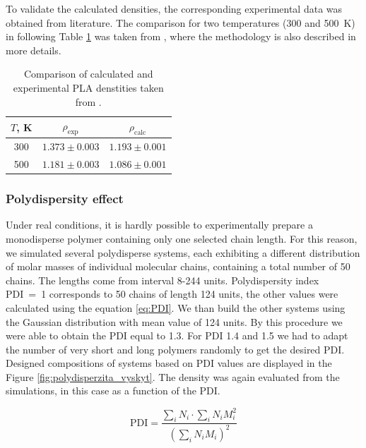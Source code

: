 To validate the calculated densities, the corresponding experimental data was obtained from literature. The comparison for two temperatures (300 and 500~K) in following Table \ref{tab:PLA_dens} was taken from \cite{klajmon_glass_2023}, where the methodology is also described in more details.

\begin{table}[htbp]
	\centering
	\caption{Comparison of calculated and experimental PLA denstities taken from \cite{klajmon_glass_2023}.}
	\begin{tabular}{ccc}
		\toprule
		$T$, K & $\rho_{\text{exp}}$ & $\rho_{\text{calc}}$ \\
		\midrule
		 300   & $1.373 \pm 0.003$ & $1.193 \pm 0.001$ \\
		 500   & $1.181 \pm 0.003$ & $1.086 \pm 0.001$ \\
		\bottomrule
	\end{tabular}%
	\label{tab:PLA_dens}%
\end{table}%

\subsubsection{Polydispersity effect}
Under real conditions, it is hardly possible to experimentally prepare a monodisperse polymer containing only one selected chain length. For this reason, we simulated several polydisperse systems, each exhibiting a different distribution of molar masses of individual molecular chains, containing a total number of 50 chains. The lengths come from interval 8-244 units. Polydispersity index PDI~=~1 corresponds to 50 chains of length 124 units, the other values were calculated using the equation \ref{eq:PDI}. We than build the other systems using the Gaussian distribution with mean value of 124 units. By this procedure we were able to obtain the PDI equal to 1.3. For PDI 1.4 and 1.5 we had to adapt the number of very short and long polymers randomly to get the desired PDI. Designed compositions of systems based on PDI values are displayed in the Figure \ref{fig:polydisperzita_vyskyt}. The density was again evaluated from the simulations, in this case as a function of the PDI.

\begin{equation}
	\text{PDI} = \frac{\sum_{i} N_{i} \cdot \sum_{i} N_{i} M_{i}^2}{\left(\sum_{i} N_{i} M_{i}\right)^2}
	\label{eq:PDI}
\end{equation}


